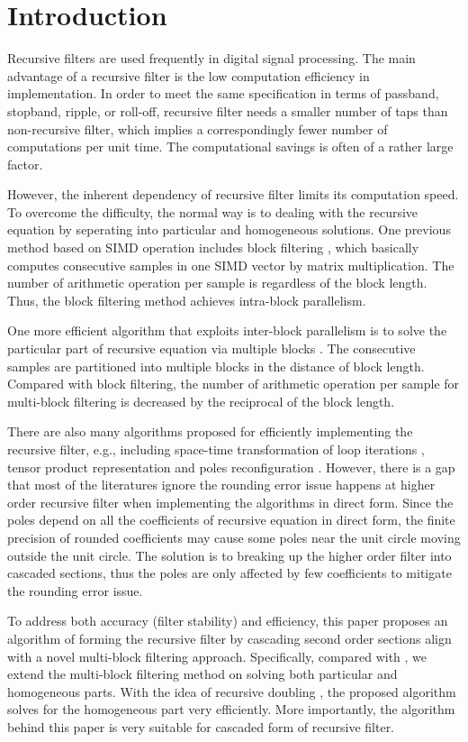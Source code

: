 \section{Introduction}
\label{sec:introduction}

Recursive filters are used frequently in digital signal processing.
The main advantage of a recursive filter is the low computation efficiency in implementation.
In order to meet the same specification in terms of passband, stopband, ripple, or roll-off,
recursive filter needs a smaller number of taps than non-recursive filter, which implies
a correspondingly fewer number of computations per unit time. 
The computational savings is often of a rather large factor.

However,
the inherent dependency of recursive filter limits its computation speed.
To overcome the difficulty, the normal way is to dealing with the recursive equation by seperating into
particular and homogeneous solutions.
One previous method based on SIMD operation includes block filtering \cite{Sung_86}, 
which basically computes consecutive samples in one SIMD vector by matrix multiplication. 
The number of arithmetic operation per sample is regardless of the block length. Thus, the block filtering method achieves
intra-block parallelism. 

One more efficient algorithm that exploits inter-block parallelism is to solve the particular part of recursive equation via multiple blocks \cite{Jaewoo_09}.
The consecutive samples are partitioned into multiple blocks in the distance of block length.
Compared with block filtering, the number of arithmetic operation per sample for multi-block filtering is decreased 
by the reciprocal of the block length. 

There are also many algorithms proposed for efficiently implementing the recursive filter, e.g., including
space-time transformation of loop iterations \cite{Schaffer_03}, tensor product representation \cite{Robelly_04} and
poles reconfiguration \cite{Liu_16}.
However, there is a gap that most of the literatures ignore the rounding error issue \cite{Christoph_97} happens at higher order recursive filter when implementing the algorithms in direct form.
Since the poles depend on all the coefficients of recursive equation in direct form, the finite precision of rounded coefficients may cause some poles near the unit circle
moving outside the unit circle. The solution is to breaking up the higher order filter into cascaded sections, thus the poles are only affected by few coefficients to mitigate
the rounding error issue.

To address both accuracy (filter stability) and efficiency, 
this paper proposes an algorithm of forming the recursive filter by cascading second order sections
align with a novel multi-block filtering approach.
Specifically, compared with \cite{Jaewoo_09}, we extend the multi-block filtering method on solving both particular and homogeneous parts. With the idea of recursive doubling \cite{Kogge_73},
the proposed algorithm solves for the homogeneous part very efficiently. More importantly, the algorithm behind this paper is very suitable for cascaded form of recursive filter.



